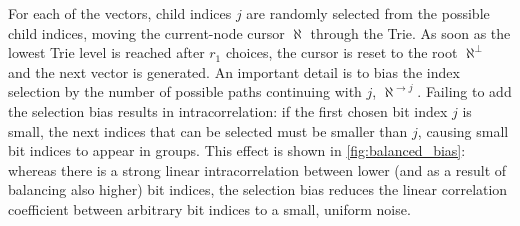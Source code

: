 For each of the \nSamples vectors, child indices $j$ are randomly selected from the possible child indices, moving the current-node cursor $\aleph$ through the Trie. As soon as the lowest Trie level is reached after $r_1$ choices, the cursor is reset to the root $\aleph^\perp$ and the next vector is generated. An important detail is to bias the index selection by the number of possible paths continuing with $j$, $\aleph^{\to j}$. Failing to add the selection bias results in intracorrelation: if the first chosen bit index $j$ is small, the next indices that can be selected must be smaller than $j$, causing small bit indices to appear in groups. This effect is shown in \cref{fig:balanced_bias}: whereas there is a strong linear intracorrelation between lower (and as a result of balancing also higher) bit indices, the selection bias reduces the linear correlation coefficient between arbitrary bit indices to a small, uniform noise.

